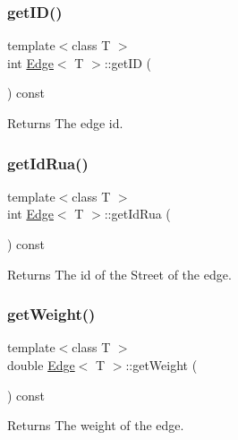 \subsubsection{\texorpdfstring{get\+I\+D()}{getID()}}
{\footnotesize\ttfamily template$<$class T $>$ \\
int \hyperlink{class_edge}{Edge}$<$ T $>$\+::get\+ID (\begin{DoxyParamCaption}{ }\end{DoxyParamCaption}) const}

\begin{DoxyReturn}{Returns}
The edge id. 
\end{DoxyReturn}
\mbox{\label{class_edge_a2abecff6ce38cb2b4d5483bbf89f8eb1}} 
\subsubsection{\texorpdfstring{get\+Id\+Rua()}{getIdRua()}}
{\footnotesize\ttfamily template$<$class T $>$ \\
int \hyperlink{class_edge}{Edge}$<$ T $>$\+::get\+Id\+Rua (\begin{DoxyParamCaption}{ }\end{DoxyParamCaption}) const}

\begin{DoxyReturn}{Returns}
The id of the Street of the edge. 
\end{DoxyReturn}
\mbox{\label{class_edge_a3df378e283d6c8be5be4170ac8d7f4e8}} 
\subsubsection{\texorpdfstring{get\+Weight()}{getWeight()}}
{\footnotesize\ttfamily template$<$class T $>$ \\
double \hyperlink{class_edge}{Edge}$<$ T $>$\+::get\+Weight (\begin{DoxyParamCaption}{ }\end{DoxyParamCaption}) const}

\begin{DoxyReturn}{Returns}
The weight of the edge. 
\end{DoxyReturn}
\mbox{\label{class_edge_ac146f766ba24b17954cc02a78ad99464}} 
